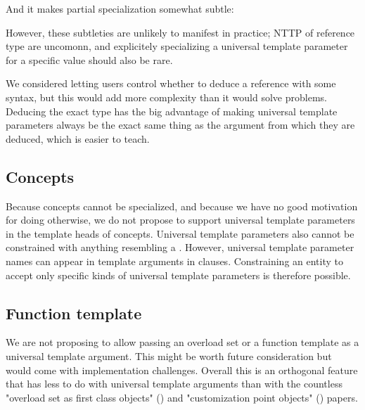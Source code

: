 \documentclass{wg21}
\begin{document}
And it makes partial specialization somewhat subtle:


However, these subtleties are unlikely to manifest in practice; NTTP of reference type are uncomonn, and explicitely specializing a universal template parameter
for a specific value should also be rare.

We considered letting users control whether to deduce a reference with some syntax, but this would add more complexity than it would solve problems.
Deducing the exact type has the big advantage of making universal template parameters always be the exact same thing as the argument from which they are deduced,
which is easier to teach.

\subsection{Concepts}

Because concepts cannot be specialized, and because we have no good motivation for doing otherwise, we do not propose to support universal template parameters in the template heads of concepts.
Universal template parameters also cannot be constrained with anything resembling a .
However, universal template parameter names can appear in template arguments in  clauses.
Constraining an entity to accept only specific kinds of universal template parameters is therefore possible.


\subsection{Function template}


We are not proposing to allow passing an overload set or a function template as a universal template argument.
This might be worth future consideration but would come with implementation challenges.
Overall this is an orthogonal feature that has less to do with universal template arguments than with the countless
"overload set as first class objects" () and "customization point objects" () papers.
\end{document}
